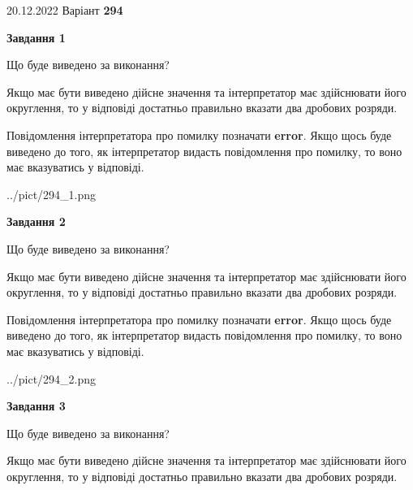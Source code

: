 \documentclass[12pt, ukrainian]{article}
\begin{document}
{20.12.2022 Варіант \No \textbf { 294 }\par}
{
\begin {Large}

{\begin {center}\textbf{Завдання 1}\end {center}}\par
Що буде виведено за виконання? \par

Якщо має бути виведено дійсне значення та інтерпретатор має здійснювати його округлення, 
то у відповіді достатньо правильно вказати два дробових розряди.

Повідомлення інтерпретатора про помилку позначати \textbf{error}.
Якщо щось буде виведено до того, як інтерпретатор видасть повідомлення про помилку, 
то воно має вказуватись у відповіді. \par

\begin{center}
	{../pict/294_1.png}
\end{center}
\newpage

{\begin {center}\textbf{Завдання 2}\end {center}}\par
Що буде виведено за виконання? \par

Якщо має бути виведено дійсне значення та інтерпретатор має здійснювати його округлення, 
то у відповіді достатньо правильно вказати два дробових розряди.

Повідомлення інтерпретатора про помилку позначати \textbf{error}.
Якщо щось буде виведено до того, як інтерпретатор видасть повідомлення про помилку, 
то воно має вказуватись у відповіді. \par

\begin{center}
	{../pict/294_2.png}
\end{center}
\newpage

{\begin {center}\textbf{Завдання 3}\end {center}}\par
Що буде виведено за виконання? \par

Якщо має бути виведено дійсне значення та інтерпретатор має здійснювати його округлення, 
то у відповіді достатньо правильно вказати два дробових розряди.


\end{Large}}
\end{document}

